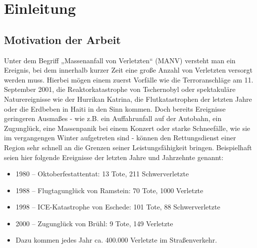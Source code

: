 \chapter{Einleitung}
\section{Motivation der Arbeit}
Unter dem Begriff „Massenanfall von Verletzten“ (MANV) versteht man ein Ereignis, bei dem innerhalb
kurzer Zeit eine große Anzahl von Verletzten versorgt werden muss. Hierbei mögen einem zuerst
Vorfälle wie die Terroranschläge am 11. September 2001, die Reaktorkatastrophe von Tschernobyl oder
spektakuläre Naturereignisse wie der Hurrikan Katrina, die Flutkatastrophen der letzten Jahre oder die
Erdbeben in Haiti in den Sinn kommen.
Doch bereits Ereignisse geringeren Ausmaßes - wie z.B. ein Auffahrunfall auf der Autobahn, ein
Zugunglück, eine Massenpanik bei einem Konzert oder starke Schneefälle, wie sie im vergangengen
Winter aufgetreten sind - können den Rettungsdienst einer Region sehr schnell an die Grenzen seiner
Leistungsfähigkeit bringen.
Beispielhaft seien hier folgende Ereignisse der letzten Jahre und Jahrzehnte genannt:

\begin{itemize}
    \item 1980 – Oktoberfestattentat: 13 Tote, 211 Schwerverletzte
    \item 1988 – Flugtagunglück von Ramstein: 70 Tote, 1000 Verletzte
    \item 1998 – ICE-Katastrophe von Eschede: 101 Tote, 88 Schwerverletzte
    \item 2000 – Zugunglück von Brühl: 9 Tote, 149 Verletzte
    \item Dazu kommen jedes Jahr ca. 400.000 Verletzte im Straßenverkehr.
\end{itemize}

